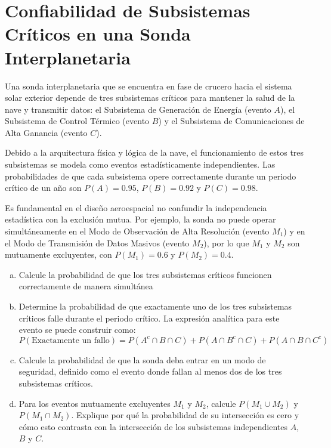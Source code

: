 \documentclass[a4paper]{article}
\begin{document}
\section{Confiabilidad de Subsistemas Críticos en una Sonda Interplanetaria}
\label{sec:problema-15}

Una sonda interplanetaria que se encuentra en fase de crucero hacia el sistema solar exterior depende de tres subsistemas críticos para mantener la salud de la nave y transmitir datos: el Subsistema de Generación de Energía (evento $A$), el Subsistema de Control Térmico (evento $B$) y el Subsistema de Comunicaciones de Alta Ganancia (evento $C$). 

Debido a la arquitectura física y lógica de la nave, el funcionamiento de estos tres subsistemas se modela como eventos estadísticamente independientes. Las probabilidades de que cada subsistema opere correctamente durante un periodo crítico de un año son $P(A) = 0.95$, $P(B) = 0.92$ y $P(C) = 0.98$.

Es fundamental en el diseño aeroespacial no confundir la independencia estadística con la exclusión mutua. Por ejemplo, la sonda no puede operar simultáneamente en el Modo de Observación de Alta Resolución (evento $M_1$) y en el Modo de Transmisión de Datos Masivos (evento $M_2$), por lo que $M_1$ y $M_2$ son mutuamente excluyentes, con $P(M_1) = 0.6$ y $P(M_2) = 0.4$.

\begin{enumerate}[a)]
\item Calcule la probabilidad de que los tres subsistemas críticos funcionen correctamente de manera simultánea
\item Determine la probabilidad de que exactamente uno de los tres subsistemas críticos falle durante el periodo crítico. La expresión analítica para este evento se puede construir como:
$$
P(\text{Exactamente un fallo}) = P(A^c \cap B \cap C) + P(A \cap B^c \cap C) + P(A \cap B \cap C^c)
$$
\item Calcule la probabilidad de que la sonda deba entrar en un modo de seguridad, definido como el evento donde fallan al menos dos de los tres subsistemas críticos.
\item Para los eventos mutuamente excluyentes $M_1$ y $M_2$, calcule $P(M_1 \cup M_2)$ y $P(M_1 \cap M_2)$. Explique por qué la probabilidad de su intersección es cero y cómo esto contrasta con la intersección de los subsistemas independientes $A$, $B$ y $C$.
\end{enumerate}
\end{document}
